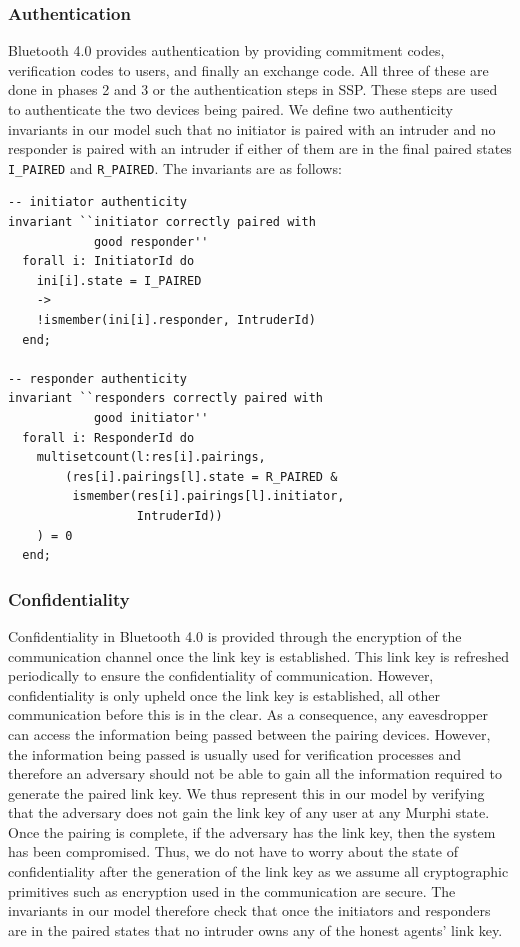 \documentclass{acm_proc_article-sp}
\begin{document}
\subsubsection{Authentication}
Bluetooth 4.0 provides authentication by providing commitment codes, verification codes to users, and finally an exchange code. All three of these are done in phases 2 and 3 or the authentication steps in SSP. These steps are used to authenticate the two devices being paired. We define two authenticity invariants in our model such that no initiator is paired with an intruder and no responder is paired with an intruder if either of them are in the final paired states \texttt{I\_PAIRED} and \texttt{R\_PAIRED}. The invariants are as follows:

\begin{verbatim}
-- initiator authenticity
invariant ``initiator correctly paired with 
            good responder''
  forall i: InitiatorId do
    ini[i].state = I_PAIRED 
    ->
    !ismember(ini[i].responder, IntruderId)
  end;

-- responder authenticity
invariant ``responders correctly paired with 
            good initiator''
  forall i: ResponderId do
    multisetcount(l:res[i].pairings, 
        (res[i].pairings[l].state = R_PAIRED &
         ismember(res[i].pairings[l].initiator,
                  IntruderId))
    ) = 0
  end;
\end{verbatim}

\subsubsection{Confidentiality}
Confidentiality in Bluetooth 4.0 is provided through the encryption of the communication channel once the link key is established. This link key is refreshed periodically to ensure the confidentiality of communication. However, confidentiality is only upheld once the link key is established, all other communication before this is in the clear. As a consequence, any eavesdropper can access the information being passed between the pairing devices. However, the information being passed is usually used for verification processes and therefore an adversary should not be able to gain all the information required to generate the paired link key. We thus represent this in our model by verifying that the adversary does not gain the link key of any user at any Murphi state. Once the pairing is complete, if the adversary has the link key, then the system has been compromised. Thus, we do not have to worry about the state of confidentiality after the generation of the link key as we assume all cryptographic primitives such as encryption used in the communication are secure. The invariants in our model therefore check that once the initiators and responders are in the paired states that no intruder owns any of the honest agents' link key.
\end{document}
